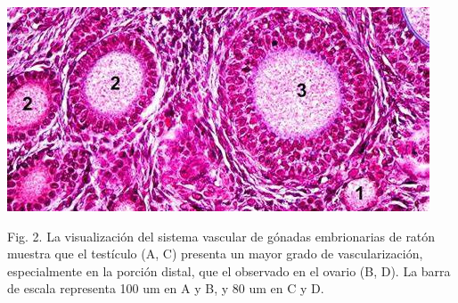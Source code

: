 \documentclass[a0,portrait]{a0poster}
\newcommand{\apartado}[1]{\noindent\fontsize{45pt}{45pt}\selectfont\textcolor[rgb]{0,0,1}{\textbf{\uppercase{#1}}}}
\newcommand{\texto}[1]{\fontsize{30pt}{30pt}\selectfont #1}
\begin{document}
\begin{multicols*}{2}

\begin{center}
\begin{minipage}[t]{\columnwidth}
\includegraphics[width=\textwidth]{fotos/Fig2poster}

\begin{framed}
Fig. 2. La visualización del sistema vascular de gónadas embrionarias de ratón muestra que el testículo (A, C) presenta un mayor grado de vascularización, especialmente en la porción distal, que el observado en el ovario (B, D). La barra de escala representa 100 um en A y B, y 80 um en C y D.\end{framed}
\end{minipage}
\end{center}

\texto{

}


\end{multicols*}
\end{document}
